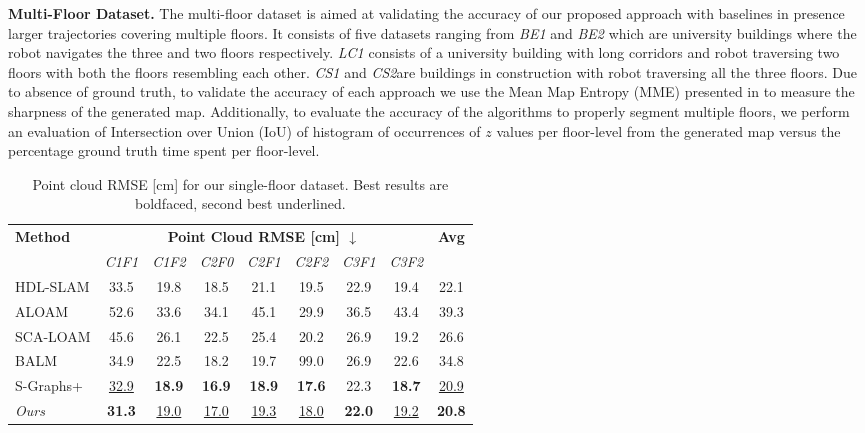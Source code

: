 \textbf{Multi-Floor Dataset.}
The multi-floor dataset is aimed at validating the accuracy of our proposed approach with baselines in presence larger trajectories covering multiple floors. It consists of five datasets ranging from \textit{BE1} and \textit{BE2} which are university buildings where the robot navigates the three and two floors respectively. \textit{LC1} consists of a university building with long corridors and robot traversing two floors with both the floors resembling each other. \textit{CS1} and \textit{CS2}are buildings in construction with robot traversing all the three floors. Due to absence of ground truth, to validate the accuracy of each approach we use the Mean Map Entropy (MME) presented in \cite{efficient_continous_SLAM} to measure the sharpness of the generated map. Additionally, to evaluate the accuracy of the algorithms to properly segment multiple floors, we perform an evaluation of Intersection over Union (IoU) of histogram of occurrences of $z$ values per floor-level from the generated map versus the percentage ground truth time spent per floor-level.  
\begin{table}[t]
\centering
\renewcommand{\arraystretch}{1.1} 
\setlength{\tabcolsep}{4pt}       
\scriptsize
\caption{Point cloud RMSE [cm] for our single-floor dataset. Best results are boldfaced, second best underlined.}
\begin{tabular}{l|ccccccc|c}
\toprule
\multirow{2}{*}{\textbf{Method}} & \multicolumn{7}{c|}{\textbf{Point Cloud RMSE [cm] $\downarrow$}} & \multirow{2}{*}{\textbf{Avg}} \\
\cmidrule(lr){2-8}
 & \textit{C1F1} & \textit{C1F2} & \textit{C2F0} & \textit{C2F1} & \textit{C2F2} & \textit{C3F1} & \textit{C3F2} \\
\midrule
HDL-SLAM \cite{hdl_graph_slam} & 33.5 & 19.8 & 18.5 & 21.1 & 19.5 & 22.9 & 19.4 & 22.1 \\
ALOAM \cite{loam}             & 52.6 & 33.6 & 34.1 & 45.1 & 29.9 & 36.5 & 43.4 & 39.3 \\
SCA-LOAM \cite{scan_context}   & 45.6 & 26.1 & 22.5 & 25.4 & 20.2 & 26.9 & 19.2 & 26.6 \\
BALM \cite{BALM}              & 34.9 & 22.5 & 18.2 & 19.7 & 99.0 & 26.9 & 22.6 & 34.8 \\
S-Graphs+ \cite{s_graphs+}     & \underline{32.9} & \textbf{18.9} & \textbf{16.9} & \textbf{18.9} & \textbf{17.6} & 22.3 & \textbf{18.7} & \underline{20.9} \\
\midrule
\textit{Ours}                & \textbf{31.3} & \underline{19.0} & \underline{17.0} & \underline{19.3} & \underline{18.0} & \textbf{22.0} & \underline{19.2} & \textbf{20.8} \\
\bottomrule
\end{tabular}
\label{tab:rmse_real_data}
\end{table}

